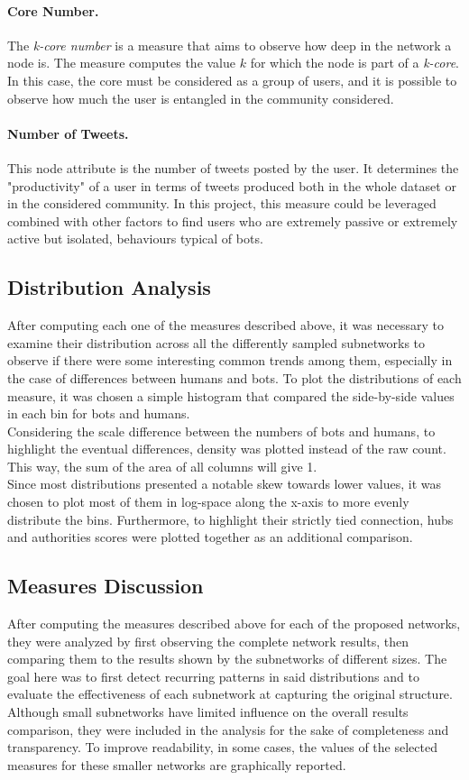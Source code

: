 \documentclass[12pt, a4paper]{article}
\begin{document}
		\paragraph{Core Number.} The \textit{k-core number} is a measure that aims to observe how deep in the network a node is. The measure computes the value $k$ for which the node is part of a \textit{k-core}. In this case, the core must be considered as a group of users, and it is possible to observe how much the user is entangled in the community considered.
        \paragraph{Number of Tweets.} This node attribute is the number of tweets posted by the user. It determines the "productivity" of a user in terms of tweets produced both in the whole dataset or in the considered community. In this project, this measure could be leveraged combined with other factors to find users who are extremely passive or extremely active but isolated, behaviours typical of bots.
	\subsection{Distribution Analysis}
    	After computing each one of the measures described above, it was necessary to examine their distribution across all the differently sampled subnetworks to observe if there were some interesting common trends among them, especially in the case of differences between humans and bots. To plot the distributions of each measure, it was chosen a simple histogram that compared the side-by-side values in each bin for bots and humans.\\      
    	Considering the scale difference between the numbers of bots and humans, to highlight the eventual differences, density was plotted instead of the raw count. This way, the sum of the area of all columns will give 1.\\
    	Since most distributions presented a notable skew towards lower values, it was chosen to plot most of them in log-space along the x-axis to more evenly distribute the bins.
    	Furthermore, to highlight their strictly tied connection, hubs and authorities scores were plotted together as an additional comparison.
    \subsection{Measures Discussion}
    	After computing the measures described above for each of the proposed networks, they were analyzed by first observing the complete network results, then comparing them to the results shown by the subnetworks of different sizes. The goal here was to first detect recurring patterns in said distributions and to evaluate the effectiveness of each subnetwork at capturing the original structure.\\
    	Although small subnetworks have limited influence on the overall results comparison, they were included in the analysis for the sake of completeness and transparency. To improve readability, in some cases, the values of the selected measures for these smaller networks are graphically reported.
\end{document}
